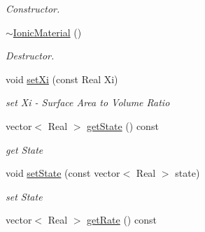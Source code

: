 \begin{DoxyCompactItemize}
\begin{DoxyCompactList}\small\item\em Constructor. \item\end{DoxyCompactList}\item 
\hypertarget{classvoom_1_1_ionic_material_a842c6d5dda37d7bd60a13e6edad7b938}{
\hyperlink{classvoom_1_1_ionic_material_a842c6d5dda37d7bd60a13e6edad7b938}{$\sim$IonicMaterial} ()}
\label{classvoom_1_1_ionic_material_a842c6d5dda37d7bd60a13e6edad7b938}

\begin{DoxyCompactList}\small\item\em Destructor. \item\end{DoxyCompactList}\item 
\hypertarget{classvoom_1_1_ionic_material_ad66c9371c9409f79c2ff3db14158140a}{
void \hyperlink{classvoom_1_1_ionic_material_ad66c9371c9409f79c2ff3db14158140a}{setXi} (const Real Xi)}
\label{classvoom_1_1_ionic_material_ad66c9371c9409f79c2ff3db14158140a}

\begin{DoxyCompactList}\small\item\em set Xi -\/ Surface Area to Volume Ratio \item\end{DoxyCompactList}\item 
\hypertarget{classvoom_1_1_ionic_material_aacccab910cf6533cb8d0e6d614d0e6c2}{
vector$<$ Real $>$ \hyperlink{classvoom_1_1_ionic_material_aacccab910cf6533cb8d0e6d614d0e6c2}{getState} () const }
\label{classvoom_1_1_ionic_material_aacccab910cf6533cb8d0e6d614d0e6c2}

\begin{DoxyCompactList}\small\item\em get State \item\end{DoxyCompactList}\item 
\hypertarget{classvoom_1_1_ionic_material_a1a8768ce529dcb907cd2fcb61b8a8078}{
void \hyperlink{classvoom_1_1_ionic_material_a1a8768ce529dcb907cd2fcb61b8a8078}{setState} (const vector$<$ Real $>$ state)}
\label{classvoom_1_1_ionic_material_a1a8768ce529dcb907cd2fcb61b8a8078}

\begin{DoxyCompactList}\small\item\em set State \item\end{DoxyCompactList}\item 
\hypertarget{classvoom_1_1_ionic_material_a013f9c225de7f6d8f063eaf520ac6026}{
vector$<$ Real $>$ \hyperlink{classvoom_1_1_ionic_material_a013f9c225de7f6d8f063eaf520ac6026}{getRate} () const }
\label{classvoom_1_1_ionic_material_a013f9c225de7f6d8f063eaf520ac6026}


\end{DoxyCompactItemize}

